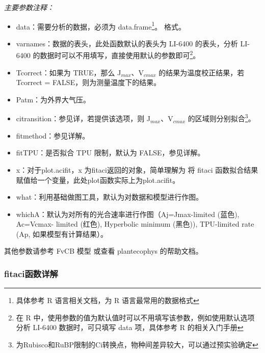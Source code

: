 \documentclass[
]{krantz}
\providecommand{\tightlist}{%
  \setlength{\itemsep}{0pt}\setlength{\parskip}{0pt}}
\begin{document}
\emph{主要参数注释：}

\begin{itemize}
\tightlist
\item
  data：需要分析的数据，必须为 data.frame\footnote{具体参考 R 语言相关文档，为 R 语言最常用的数据格式}。
  格式。
\item
  varnames：数据的表头，此处函数默认的表头为 LI-6400 的表头，分析 LI-6400 的数据时可以不用填写，直接使用默认的参数即可\footnote{在 R 中，使用参数的值为默认值时可以不用填写该参数，例如使用默认选项分析 LI-6400 数据时，可只填写 data 项，具体参考
    R 的相关入门手册}。
\item
  Tcorrect：如果为 TRUE，那么 J\(_{max}\)、V\(_{cmax}\) 的结果为温度校正结果，若 Tcorrect = FALSE，则为测量温度下的结果。
\item
  Patm：为外界大气压。
\item
  citransition：参见详，若提供该选项，则 J\(_{max}\)、V\(_{cmax}\)
  的区域则分别拟合\footnote{为Rubisco和RuBP限制的Ci转换点，物种间差异较大，可以通过预实验确定}。
\item
  fitmethod：参见详解。
\item
  fitTPU：是否拟合 TPU 限制，默认为 FALSE，参见详解。
\item
  x：对于plot.acifit，x 为fitaci返回的对象，简单理解为 将 fitaci 函数拟合结果赋值给一个变量，此处plot函数实际上为plot.acifit。
\item
  what：利用基础做图工具，默认为对数据和模型进行作图。
\item
  whichA：默认为对所有的光合速率进行作图（Aj=Jmax-limited (蓝色), Ac=Vcmax- limited (红色),
  Hyperbolic minimum (黑色)), TPU-limited rate (Ap, 如果模型有计算结果）。
\end{itemize}

其他参数请参考 FvCB 模型 \citet{Farquhar1980A} 或查看 plantecophys 的帮助文档。

\hypertarget{fitaci_detail}{%
\subsubsection{fitaci函数详解}\label{fitaci_detail}}
\end{document}
